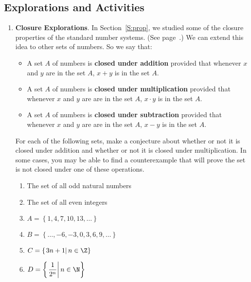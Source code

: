 \subsection*{Explorations and Activities}
\setcounter{oldenumi}{\theenumi}
\begin{enumerate} \setcounter{enumi}{\theoldenumi}
\item \textbf{Closure Explorations}.  In Section~\ref{S:prop}, we studied some of the closure properties of the standard number systems.  (See page~\pageref{ss:closure}.)  We can extend this idea to other sets of numbers.  So we say that:  
\begin{itemize}
  \item A set $A$ of numbers is \textbf{closed under addition} provided that whenever  $x$  and  $y$  are in the set $A$,   $x + y$ is in the set $A$.
%

  \item A set $A$ of numbers is \textbf{closed under multiplication} provided that whenever  $x$  and  $y$  are are in the set $A$,   
$x \cdot y$ is in the set $A$.
%

  \item A set $A$ of numbers is \textbf{closed under subtraction} provided that whenever  $x$  and  $y$  are are in the set $A$,   
$x - y$ is in the set $A$.
%
\end{itemize}


For each of the following sets, make a conjecture about whether or not it is closed under addition and whether or not it is closed under multiplication.  In some cases, you may be able to find a counterexample that will prove the set is not closed under one of these operations.

\begin{multicols}{2}
\begin{enumerate}
\item The set of all odd natural numbers

\item The set of all even integers

\item $A = \left\{ 1, 4, 7, 10, 13, \ldots \right\}$

\item $B = \left\{ \ldots , -6, -3, 0, 3, 6, 9, \ldots \right\}$

\item $C = \left\{ \left. 3n + 1 \right| n \in \Z \right\}$

\item $D = \left\{ \left. \dfrac{1}{2^n} \right| n \in \N \right\}$

\end{enumerate}
\end{multicols}
\end{enumerate}

\hbreak



\endinput
